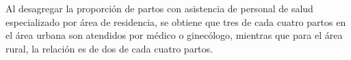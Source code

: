  Al desagregar la proporción de partos con asistencia de personal de salud especializado por área de residencia, se obtiene que tres de cada cuatro partos en el área urbana son atendidos por médico o ginecólogo, mientras que para el área rural, la relación es de  dos de cada cuatro partos.